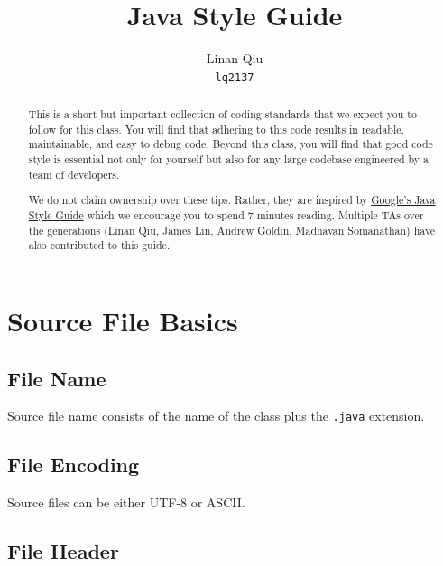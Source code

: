 \documentclass[10pt,DIV=23,landscape]{scrartcl}
\title{Java Style Guide}
\author{Linan Qiu\\\texttt{lq2137}}
\begin{document}
\maketitle

\begin{abstract}
This is a short but important collection of coding standards that we
expect you to follow for this class. You will find that adhering to this
code results in readable, maintainable, and easy to debug code. Beyond
this class, you will find that good code style is essential not only for
yourself but also for any large codebase engineered by a team of
developers.

We do not claim ownership over these tips. Rather, they are inspired by
\href{https://google.github.io/styleguide/javaguide.html}{Google's Java
Style Guide} which we encourage you to spend 7 minutes reading. Multiple
TAs over the generations (Linan Qiu, James Lin, Andrew Goldin, Madhavan
Somanathan) have also contributed to this guide.
\end{abstract}

\section{Source File Basics}\label{source-file-basics}

\begin{paracol}{2}
\begin{leftcolumn}
\subsection{File Name}\label{file-name}

Source file name consists of the name of the class plus the
\lstinline{.java} extension.
\end{leftcolumn}

\begin{rightcolumn}
\subsection{File Encoding}\label{file-encoding}

Source files can be either UTF-8 or ASCII.
\end{rightcolumn}
\end{paracol}

\subsection{File Header}\label{file-header}
\end{document}
